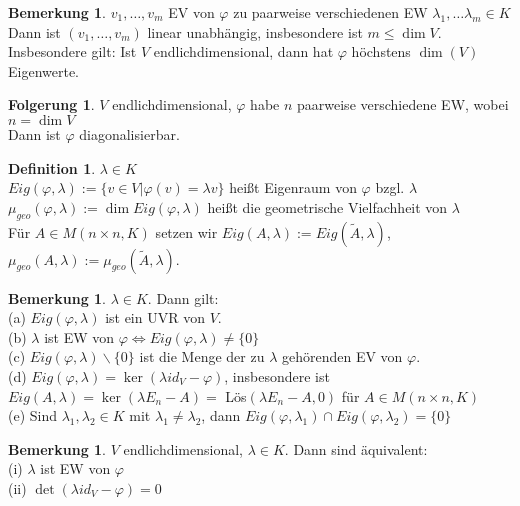 \documentclass[10pt,a4paper,numbers=endperiod]{scrartcl}
\theoremstyle{definition}
\newtheorem{defi}[satz]{Definition}
\newtheorem{bem}[satz]{Bemerkung}
\newtheorem{folg}[satz]{Folgerung}
\begin{document}
\begin{bem}
	$v_1,\ldots, v_m$ EV von $\varphi$ zu paarweise verschiedenen EW $\lambda_1,\ldots\lambda_m \in K$\\
	Dann ist $(v_1,\ldots,v_m)$ linear unabhängig, insbesondere ist $m \leq \dim V$.\\
	Insbesondere gilt: Ist $V$ endlichdimensional, dann hat $\varphi$ höchstens $\dim(V)$ Eigenwerte. 
\end{bem}

\begin{folg}
	$V$ endlichdimensional, $\varphi$ habe $n$ paarweise verschiedene EW, wobei $n = \dim V$\\
	Dann ist $\varphi$ diagonalisierbar.
\end{folg}

\begin{defi}
	$\lambda \in K$\\
	$Eig(\varphi, \lambda) := \{v \in V| \varphi(v) = \lambda v\}$ heißt Eigenraum von $\varphi$ bzgl. $\lambda$\\
	$\mu_{geo} (\varphi, \lambda) := \dim Eig(\varphi, \lambda)$ heißt die geometrische Vielfachheit von $\lambda$\\
	Für $A \in M(n \times n, K)$ setzen wir $Eig(A, \lambda) := Eig(\tilde{A},\lambda)$, $\mu_{geo}(A, \lambda) := \mu_{geo}(\tilde{A}, \lambda)$. 
\end{defi}

\begin{bem}
	$\lambda \in K$. Dann gilt:\\
	(a) $Eig(\varphi, \lambda)$ ist ein UVR von $V$.\\
	(b) $\lambda$ ist EW von $\varphi \Leftrightarrow Eig(\varphi, \lambda) \neq \{0\}$\\
	(c) $Eig(\varphi, \lambda)\backslash \{0\}$ ist die Menge der zu $\lambda$ gehörenden EV von $\varphi$.\\
	(d) $Eig(\varphi, \lambda) = \ker(\lambda id_V - \varphi)$, insbesondere ist $Eig(A,\lambda) = \ker(\lambda E_n - A) =$ Lös$(\lambda E_n - A, 0)$ für $A \in M(n \times n, K)$\\
	(e) Sind $\lambda_1, \lambda_2 \in K$ mit $\lambda_1 \neq \lambda_2$, dann $Eig(\varphi, \lambda_1) \cap Eig(\varphi, \lambda_2) = \{0\}$
\end{bem}

\begin{bem}
	$V$ endlichdimensional, $\lambda \in K$. Dann sind äquivalent:\\
	(i) $\lambda$ ist EW von $\varphi$\\
	(ii) $\det(\lambda id_V - \varphi) = 0$
\end{bem}
\end{document}
